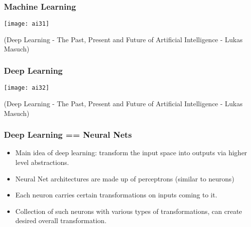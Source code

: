 \begin{frame}[fragile] \frametitle{Machine Learning}
\begin{center}
\texttt{[image: ai31]}
\end{center}
{\tiny (Deep Learning - The Past, Present and Future of Artificial Intelligence - Lukas Masuch)}
\end{frame}

\begin{frame}[fragile] \frametitle{Deep Learning}
\begin{center}
\texttt{[image: ai32]}
\end{center}
{\tiny (Deep Learning - The Past, Present and Future of Artificial Intelligence - Lukas Masuch)}
\end{frame}




\begin{frame}[fragile] \frametitle{Deep Learning == Neural Nets }

\begin{itemize}
\item Main idea of deep learning: transform the input space into outputs via higher level abstractions.
\item Neural Net architectures are made up of perceptrons (similar to neurons) 
\item Each neuron carries certain transformations on inputs coming to it.
\item Collection of such neurons with various types of transformations, can create desired overall transformation.
\end{itemize}
\end{frame}



